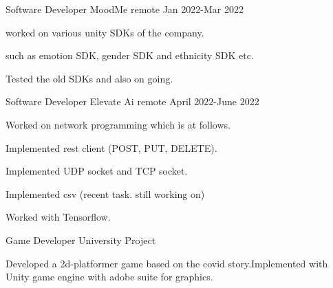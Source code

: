 

\begin{cventries}

 
  \cventry
    {Software Developer} %
    {MoodMe} %
    {remote} %
    {Jan 2022-Mar 2022} %
    {
      \begin{cvitems} %
        \item {worked on various unity SDKs of the company. }
        \item {such as emotion SDK, gender SDK and ethnicity SDK etc.}
        \item {Tested the old SDKs and also on going.}
      \end{cvitems}
    }

 
  \cventry
    {Software Developer} %
    {Elevate Ai} %
    {remote} %
    {April 2022-June 2022} %
    {
      \begin{cvitems} %
        \item {Worked on network programming which is at follows. }
        \item { Implemented rest client (POST, PUT, DELETE). }
		\item { Implemented UDP socket and TCP socket. }
        \item { Implemented csv (recent task. still working on) }
        \item { Worked with Tensorflow.}
      \end{cvitems}
    }

  \cventry
    {Game Developer} %
    {University Project} %
    {} %
    {} %
    {
      \begin{cvitems} %
        \item {Developed a 2d-platformer game based on the covid story.Implemented with Unity game engine with adobe suite for graphics.}
      \end{cvitems}
    }


\end{cventries}
